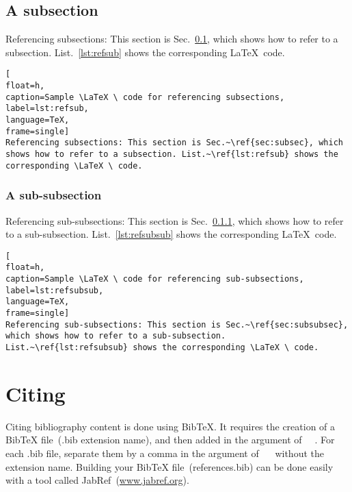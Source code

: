 \subsection{A subsection}
\label{sec:subsec}

Referencing subsections: This section is Sec.~\ref{sec:subsec}, which shows how to refer to a subsection. List.~\ref{lst:refsub} shows the corresponding \LaTeX \ code. 

\begin{lstlisting}[
float=h,
caption=Sample \LaTeX \ code for referencing subsections, 
label=lst:refsub,
language=TeX,
frame=single]
Referencing subsections: This section is Sec.~\ref{sec:subsec}, which shows how to refer to a subsection. List.~\ref{lst:refsub} shows the corresponding \LaTeX \ code. 
\end{lstlisting} 
\graytx{\blindtext}
\cleardoublepage





\subsubsection{A sub-subsection}
\label{sec:subsubsec}


Referencing sub-subsections: This section is Sec.~\ref{sec:subsubsec}, which shows how to refer to a sub-subsection.  List.~\ref{lst:refsubsub} shows the corresponding \LaTeX \ code. 

\begin{lstlisting}[
float=h,
caption=Sample \LaTeX \ code for referencing sub-subsections, 
label=lst:refsubsub,
language=TeX,
frame=single]
Referencing sub-subsections: This section is Sec.~\ref{sec:subsubsec}, which shows how to refer to a sub-subsection. List.~\ref{lst:refsubsub} shows the corresponding \LaTeX \ code. 
\end{lstlisting}

\graytx{\blindtext}
\cleardoublepage





\newpage
\section{Citing}
\label{sec:cit}

Citing bibliography content is done using BibTeX. It requires the creation of a BibTeX file~(.bib extension name), and then added in the argument of \verb|  |. For each .bib file, separate them by a comma in the argument of \verb|  | without the extension name. Building your BibTeX file~(references.bib) can be done easily with a tool called JabRef~(\url{www.jabref.org}).

